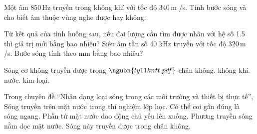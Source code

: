 \begin{ex}
Một âm $850\,\text{Hz}$ truyền trong không khí với tốc độ $340\,\text{m}$ /s. Tính bước sóng và cho biết âm thuộc vùng nghe được hay không.
\choiceTF

\end{ex}

\begin{ex}
Từ kết quả của tình huống sau, nếu đại lượng cần tìm được nhân với hệ số 1.5 thì giá trị mới bằng bao nhiêu? Siêu âm tần số 40 kHz truyền với tốc độ $320\,\text{m}$ /s. Bước sóng tính theo mm bằng bao nhiêu?
\end{ex}

\begin{ex}
Sóng cơ không truyền được trong $\nguon{ly11 kntt.pdf}$
\choice
{\True chân không.}
{không khí.}
{nước.}
{kim loại.}
\end{ex}

\begin{ex}
Trong chuyên đề “Nhận dạng loại sóng trong các môi trường và thiết bị thực tế”, Sóng truyền trên mặt nước trong thí nghiệm lớp học.
\choiceTF
{\True Có thể coi gần đúng là sóng ngang.}
{\True Phần tử mặt nước dao động chủ yếu lên xuống.}
{\True Phương truyền sóng nằm dọc mặt nước.}
{Sóng này truyền được trong chân không.}
\end{ex}

